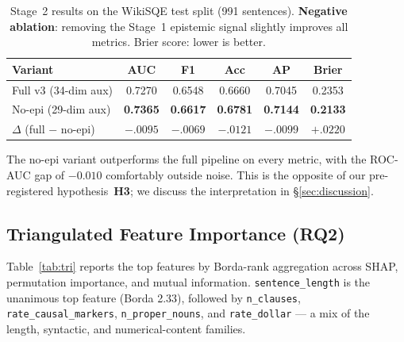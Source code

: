 \documentclass[conference]{IEEEtran}
\begin{document}
\begin{table}[t]
\centering
\caption{Stage~2 results on the WikiSQE test split (991 sentences).
\textbf{Negative ablation}: removing the Stage~1 epistemic signal
slightly improves all metrics. Brier score: lower is better.}
\label{tab:s2ablation}
\small
\setlength{\tabcolsep}{2.5pt}
\begin{tabular}{lccccc}
\toprule
\textbf{Variant} & \textbf{AUC} & \textbf{F1} & \textbf{Acc} & \textbf{AP} & \textbf{Brier} \\
\midrule
Full v3 (34-dim aux)       & 0.7270 & 0.6548 & 0.6660 & 0.7045 & 0.2353 \\
No-epi (29-dim aux)        & \textbf{0.7365} & \textbf{0.6617} & \textbf{0.6781} & \textbf{0.7144} & \textbf{0.2133} \\
\midrule
$\Delta$ (full $-$ no-epi) & $-.0095$ & $-.0069$ & $-.0121$ & $-.0099$ & $+.0220$ \\
\bottomrule
\end{tabular}
\end{table}

The no-epi variant outperforms the full pipeline on every metric, with the
ROC-AUC gap of $-0.010$ comfortably outside noise. This is the
opposite of our pre-registered hypothesis~\textbf{H3}; we discuss the
interpretation in \S\ref{sec:discussion}.

\subsection{Triangulated Feature Importance (RQ2)}

Table~\ref{tab:tri} reports the top features by Borda-rank aggregation
across SHAP, permutation importance, and mutual information.
\texttt{sentence\_length} is the unanimous top feature (Borda 2.33),
followed by \texttt{n\_clauses}, \texttt{rate\_causal\_markers},
\texttt{n\_proper\_nouns}, and \texttt{rate\_dollar} --- a mix of the
length, syntactic, and numerical-content families.
\end{document}
